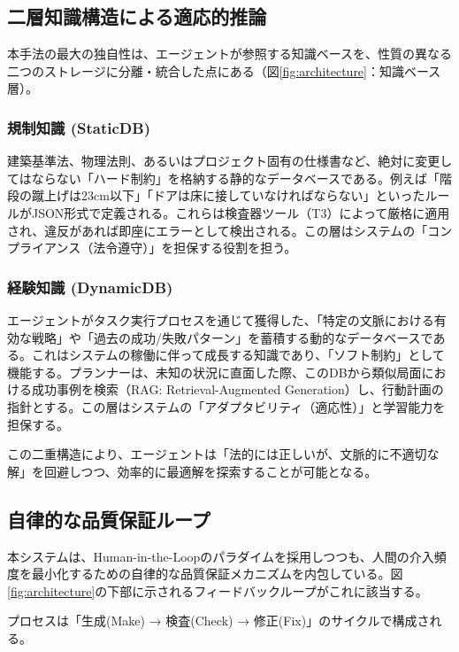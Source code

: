 \documentclass[dvipdfmx, a4paper, 9pt]{deimj}
\begin{document}
\subsection{二層知識構造による適応的推論}

本手法の最大の独自性は、エージェントが参照する知識ベースを、性質の異なる二つのストレージに分離・統合した点にある（図\ref{fig:architecture}：知識ベース層）。

\subsubsection{規制知識 (StaticDB)}

建築基準法、物理法則、あるいはプロジェクト固有の仕様書など、絶対に変更してはならない「ハード制約」を格納する静的なデータベースである。例えば「階段の蹴上げは23cm以下」「ドアは床に接していなければならない」といったルールがJSON形式で定義される。これらは検査器ツール（T3）によって厳格に適用され、違反があれば即座にエラーとして検出される。この層はシステムの「コンプライアンス（法令遵守）」を担保する役割を担う。

\subsubsection{経験知識 (DynamicDB)}

エージェントがタスク実行プロセスを通じて獲得した、「特定の文脈における有効な戦略」や「過去の成功/失敗パターン」を蓄積する動的なデータベースである\cite{wang2023voyager}。これはシステムの稼働に伴って成長する知識であり、「ソフト制約」として機能する。プランナーは、未知の状況に直面した際、このDBから類似局面における成功事例を検索（RAG: Retrieval-Augmented Generation\cite{lewis2020rag}）し、行動計画の指針とする。この層はシステムの「アダプタビリティ（適応性）」と学習能力を担保する。

この二重構造により、エージェントは「法的には正しいが、文脈的に不適切な解」を回避しつつ、効率的に最適解を探索することが可能となる。

\subsection{自律的な品質保証ループ}

本システムは、Human-in-the-Loopのパラダイムを採用しつつも、人間の介入頻度を最小化するための自律的な品質保証メカニズムを内包している。図\ref{fig:architecture}の下部に示されるフィードバックループがこれに該当する。

プロセスは「生成(Make) → 検査(Check) → 修正(Fix)」のサイクルで構成される。
\end{document}
